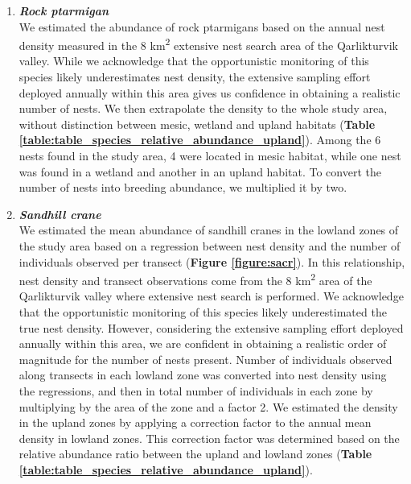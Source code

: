 \documentclass[a4paper,twoside,12pt]{article}
\begin{document}
\begin{enumerate}[label=\alph*.]
                \item[] \textit{\textbf{Rock ptarmigan}}\\
                We estimated the abundance of rock ptarmigans based on the annual nest density measured in the 8 km\textsuperscript{2} extensive nest search area of the Qarlikturvik valley. While we acknowledge that the opportunistic monitoring of this species likely underestimates nest density, the extensive sampling effort deployed annually within this area gives us confidence in obtaining a realistic number of nests. We then extrapolate the density to the whole study area, without distinction between mesic, wetland and upland habitats (\textbf{Table \ref{table:table_species_relative_abundance_upland}}). Among the 6 nests found in the study area, 4 were located in mesic habitat, while one nest was found in a wetland and another in an upland habitat. To convert the number of nests into breeding abundance, we multiplied it by two.
                
                \item[] \textit{\textbf{Sandhill crane}}\\
                We estimated the mean abundance of sandhill cranes in the lowland zones of the study area based on a regression between nest density and the number of individuals observed per transect (\textbf{Figure \ref{figure:sacr}}). In this relationship, nest density and transect observations come from the 8 km\textsuperscript{2} area of the Qarlikturvik valley where extensive nest search is performed. We acknowledge that the opportunistic monitoring of this species likely underestimated the true nest density. However, considering the extensive sampling effort deployed annually within this area, we are confident in obtaining a realistic order of magnitude for the number of nests present. Number of individuals observed along transects in each lowland zone was converted into nest density using the regressions, and then in total number of individuals in each zone by multiplying by the area of the zone and a factor 2. We estimated the density in the upland zones by applying a correction factor to the annual mean density in lowland zones. This correction factor was determined based on the relative abundance ratio between the upland and lowland zones (\textbf{Table \ref{table:table_species_relative_abundance_upland}}). 
                

\end{enumerate}
\end{document}
